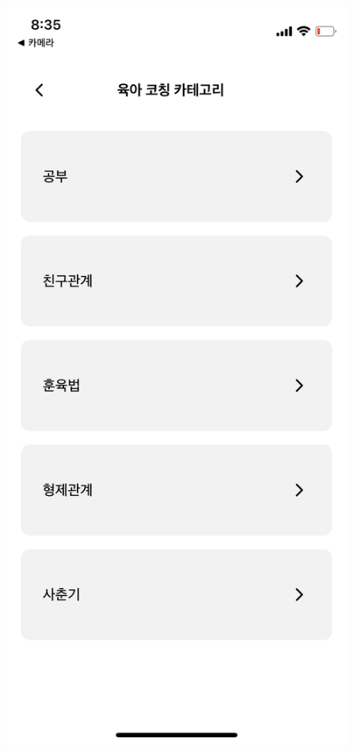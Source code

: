 \documentclass[conference]{IEEEtran}
\begin{document}
\begin{enumerate}
\begin{enumerate}
        \begin{figure}[H]
        \centering
        \includegraphics[scale=0.1]{UseCases/8.category.png}

\end{figure}
\end{enumerate}
\end{enumerate}
\end{document}
